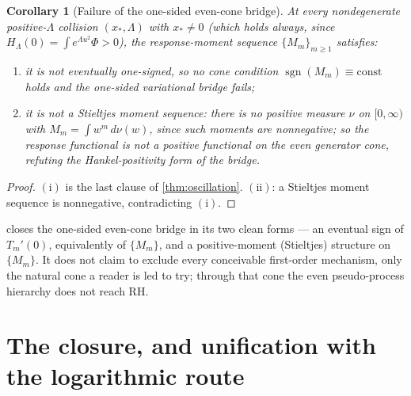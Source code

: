 \documentclass[11pt,reqno]{amsart}
\theoremstyle{plain}
\newtheorem{corollary}[theorem]{Corollary}
\theoremstyle{definition}
\theoremstyle{remark}
\DeclareMathOperator{\sgn}{sgn}
\begin{document}
\begin{corollary}[Failure of the one-sided even-cone bridge]
\label{cor:nogo}
At every nondegenerate positive-$\Lambda$ collision $(x_*,\Lambda)$ with
$x_*\neq0$ (which holds always, since $H_\Lambda(0)=\int e^{\Lambda u^2}
\Phi>0$), the response-moment sequence $\{M_m\}_{m\ge1}$ satisfies:
\begin{enumerate}
\item[$(\mathrm i)$] it is \emph{not eventually one-signed}, so no cone
condition $\sgn(M_m)\equiv\text{const}$ holds and the one-sided variational
bridge fails;
\item[$(\mathrm{ii})$] it is \emph{not a Stieltjes moment sequence}: there is
no positive measure $\nu$ on $[0,\infty)$ with $M_m=\int w^m\,d\nu(w)$, since
such moments are nonnegative; so the response functional is not a positive
functional on the even generator cone, refuting the Hankel-positivity form
of the bridge.
\end{enumerate}
\end{corollary}

\begin{proof}
$(\mathrm i)$ is the last clause of \cref{thm:oscillation}. $(\mathrm{ii})$:
a Stieltjes moment sequence is nonnegative, contradicting $(\mathrm i)$.
\end{proof}

 closes the one-sided even-cone bridge in its two clean forms
--- an eventual sign of $T_m'(0)$, equivalently of $\{M_m\}$, and a
positive-moment (Stieltjes) structure on $\{M_m\}$. It does not claim to
exclude every conceivable first-order mechanism, only the natural cone a
reader is led to try; through that cone the even pseudo-process hierarchy
does not reach RH.

\section{The closure, and unification with the logarithmic route}
\label{sec:closure}
\end{document}
